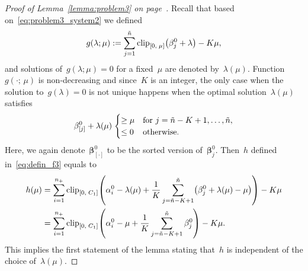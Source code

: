 \topinith*
\begin{proof}[Proof of Lemma~\ref{lemma:problem3} on page~\pageref{lemma:problem3}]
  Recall that based on~\eqref{eq:problem3_system2} we defined
  \begin{equation*}
    g(\lambda; \mu) := \sum_{j=1}^{\ntil} \clip{0}{\mu}{\beta_j^0 + \lambda} - K \mu,
  \end{equation*}
  and solutions of~$g(\lambda; \mu) = 0$ for a fixed~$\mu$ are denoted by~$\lambda(\mu)$. Function~$g(\cdot; \, \mu)$ is non-decreasing and since~$K$ is an integer, the only case when the solution to~$g(\lambda) = 0$ is not unique happens when the optimal solution~$\lambda(\mu)$ satisfies
  \begin{equation}\label{eq:system2_bl}
    \beta_{[j]}^0 + \lambda(\mu) \;
    \begin{cases}
      \ge \mu & \text{for } j = \ntil - K + 1, \dots , \ntil, \\
      \le 0 & \text{otherwise.}
    \end{cases}
  \end{equation}
  Here, we again denote~$\bm{\beta}_{[\cdot]}^0$ to be the sorted version of~$\bm{\beta}_j^0$. Then~$h$ defined in~\eqref{eq:defin_f3} equals to
  \begin{align*}
    h(\mu)
      & = \sum_{i=1}^{\npos} \clip{0}{C_1}{\alpha_i^0 - \lambda(\mu) + \frac{1}{K} \sum_{j=\ntil - K + 1}^{\ntil} \Brac{\beta_j^0+\lambda(\mu) - \mu}} - K \mu \\
      & = \sum_{i=1}^{\npos} \clip{0}{C_1}{\alpha_i^0 - \mu + \frac{1}{K} \sum_{j=\ntil - K + 1}^{\ntil} \beta_j^0} - K \mu.
  \end{align*}
  This implies the first statement of the lemma stating that~$h$ is independent of the choice of~$\lambda(\mu)$.


\end{proof}
